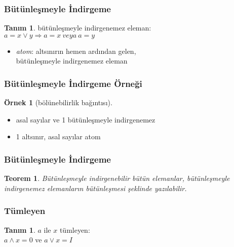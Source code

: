 \documentclass[dvipsnames]{beamer}
\theoremstyle{definition}
\newtheorem{tanim}[theorem]{Tanım}
\theoremstyle{example}
\newtheorem{ornek}[theorem]{Örnek}
\theoremstyle{plain}
\newtheorem{teorem}[theorem]{Teorem}
\begin{document}
\begin{frame}
  \frametitle{Bütünleşmeyle İndirgeme}

  \begin{tanim}
    \alert{bütünleşmeyle indirgenemez eleman}:\\
    $a = x \vee y \Rightarrow a = x ~veya~ a = y$
  \end{tanim}

  \pause
  \medskip
  \begin{itemize}
    \item \emph{atom}: altsınırın hemen ardından gelen,\\
      bütünleşmeyle indirgenemez eleman
  \end{itemize}
\end{frame}

\begin{frame}
  \frametitle{Bütünleşmeyle İndirgeme Örneği}

  \begin{ornek}[bölünebilirlik bağıntısı]
    \begin{itemize}
      \item asal sayılar ve 1 bütünleşmeyle indirgenemez

      \pause
      \medskip
      \item 1 altsınır, asal sayılar atom
    \end{itemize}
  \end{ornek}
\end{frame}

\begin{frame}
  \frametitle{Bütünleşmeyle İndirgeme}

  \begin{teorem}
    Bütünleşmeyle indirgenebilir bütün elemanlar, bütünleşmeyle indirgenemez
    elemanların bütünleşmesi şeklinde yazılabilir.
  \end{teorem}
\end{frame}

\begin{frame}
  \frametitle{Tümleyen}

  \begin{tanim}
    $a$ ile $x$ \alert{tümleyen}:\\
    $a \wedge x = 0$ ve $a \vee x = I$
  \end{tanim}
\end{frame}
\end{document}
